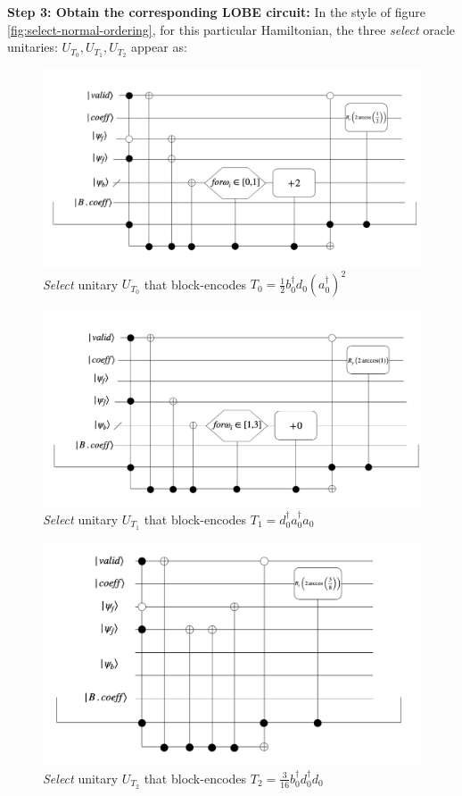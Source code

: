 \textbf{Step 3: Obtain the corresponding LOBE circuit:} In the style of figure \ref{fig:select-normal-ordering}, for this particular Hamiltonian, the three \textit{select} oracle unitaries: $U_{T_0}, U_{T_1}, U_{T_2}$ appear as:
\begin{figure}[h]
    \includegraphics[width = 0.7\linewidth]{figures/T0.png}
    \caption{\textit{Select} unitary $U_{T_0}$ that block-encodes $T_0 = \frac{1}{2}b_0^\dagger d_0(a_0^\dagger)^2$}
\end{figure}
\begin{figure}[h]
    \includegraphics[width = 0.7\linewidth]{figures/T1.png}
    \caption{\textit{Select} unitary $U_{T_1}$ that block-encodes $T_1 = d_0^\dagger a_0^\dagger a_0 $}
\end{figure}
\begin{figure}[h]
    \includegraphics[width = 0.7\linewidth]{figures/T2.png}
    \caption{\textit{Select} unitary $U_{T_2}$ that block-encodes $T_2 = \frac{3}{16}b_0^\dagger d_0^\dagger d_0$}
\end{figure}

